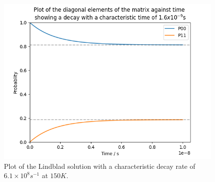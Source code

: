 \begin{figure}
    \centering
    \includegraphics[width=.5\linewidth]{Figures/Redfield/Plot of lindblad solution.png}
    \caption{Plot of the Lindblad solution with a characteristic decay
    rate of \(6.1\times{}10^{8}s^{-1}\) at
    \(150K\).
    }\label{fig:two site lindblad soluton}
\end{figure}


